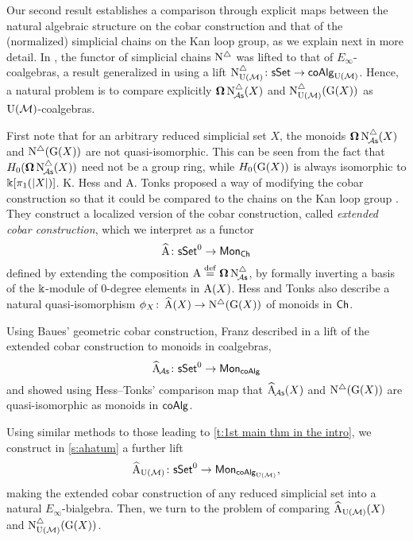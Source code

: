Our second result establishes a comparison through explicit maps between the natural algebraic structure on the cobar construction and that of the (normalized) simplicial chains on the Kan loop group, as we explain next in more detail. In \cite{mcclure2003multivariable, berger2004combinatorial}, the functor of simplicial chains $\operatorname{N^{\triangle}}$ was lifted to that of $E_{\infty}$-coalgebras, a result generalized in \cite{medina2020prop1} using a lift $\operatorname{N^{\triangle}_{{\operatorname{U}(\mathcal{M})}}} \colon \mathsf{sSet} \to \mathsf{coAlg}_{{\operatorname{U}(\mathcal{M})}}$.
Hence, a natural problem is to compare explicitly $\operatorname{\mathbf{\Omega}} \operatorname{N^{\triangle}_{\!{\mathcal{A}\mathsf{s}}}}(X)$ and $\operatorname{N^{\triangle}_{{\operatorname{U}(\mathcal{M})}}}(\operatorname{G}(X))$ as ${\operatorname{U}(\mathcal{M})}$-coalgebras.

First note that for an arbitrary reduced simplicial set $X$, the monoids $\operatorname{\mathbf{\Omega}} \operatorname{N^{\triangle}_{\!{\mathcal{A}\mathsf{s}}}}(X)$ and $\operatorname{N^{\triangle}}(\operatorname{G}(X))$ are not quasi-isomorphic.
This can be seen from the fact that $H_0(\operatorname{\mathbf{\Omega}} \operatorname{N^{\triangle}_{\!{\mathcal{A}\mathsf{s}}}}(X))$ need not be a group ring, while $H_0(\operatorname{G}(X))$ is always isomorphic to $ \Bbbk[\pi_1(|X|)]$.
K. Hess and A. Tonks proposed a way of modifying the cobar construction so that it could be compared to the chains on the Kan loop group \cite{hess2010cobar}.
They construct a localized version of the cobar construction, called \textit{extended cobar construction}, which we interpret as a functor
\[
\operatorname{\widehat{A}} \colon \mathsf{sSet}^0 \to \mathsf{Mon}_{\mathsf{Ch}}
\]
defined by extending the composition $\operatorname{A} \stackrel{\mathrm{def}}{=} \operatorname{\mathbf{\Omega}} \operatorname{N^{\triangle}_{\!{\mathcal{A}\mathsf{s}}}}$, by formally inverting a basis of the $\Bbbk$-module of $0$-degree elements in $\operatorname{A}(X)$.
Hess and Tonks also describe a natural quasi-isomorphism $\phi_X \colon \operatorname{\widehat{A}}(X) \to \operatorname{N^{\triangle}}(\operatorname{G}(X))$ of monoids in $\mathsf{Ch}$.

Using Baues’ geometric cobar construction, Franz described in \cite{franz2020szczarba} a lift of the extended cobar construction to monoids in coalgebras,
\[
\operatorname{\widehat{A}}_{\!{\mathcal{A}\mathsf{s}}} \colon \mathsf{sSet}^0 \to \mathsf{Mon}_{\mathsf{coAlg}}
\]
and showed using Hess--Tonks' comparison map that $\operatorname{\widehat{A}_{\!{\mathcal{A}\mathsf{s}}}}(X)$ and $\operatorname{N^{\triangle}}(\operatorname{G}(X))$ are quasi-isomorphic as monoids in $\mathsf{coAlg}$.

Using similar methods to those leading to \cref{t:1st main thm in the intro}, we construct in \cref{s:ahatum} a further lift
\[
\operatorname{\widehat{A}_{{\operatorname{U}(\mathcal{M})}}} \colon \mathsf{sSet}^0 \to \mathsf{Mon}_{\mathsf{coAlg}_{\operatorname{U}(\mathcal{M})}},
\]
making the extended cobar construction of any reduced simplicial set into a natural $E_\infty$-bialgebra.
Then, we turn to the problem of comparing $\operatorname{\widehat{A}_{{\operatorname{U}(\mathcal{M})}}}(X)$ and $\operatorname{N^{\triangle}_{{\operatorname{U}(\mathcal{M})}}}(\operatorname{G}(X))$.

